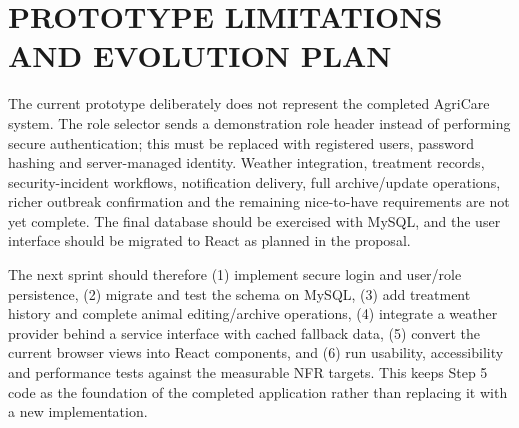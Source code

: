 \documentclass[10pt,twocolumn]{article}
\begin{document}
\section{PROTOTYPE LIMITATIONS AND EVOLUTION PLAN}
The current prototype deliberately does not represent the completed AgriCare system. The role selector sends a demonstration role header instead of performing secure authentication; this must be replaced with registered users, password hashing and server-managed identity. Weather integration, treatment records, security-incident workflows, notification delivery, full archive/update operations, richer outbreak confirmation and the remaining nice-to-have requirements are not yet complete. The final database should be exercised with MySQL, and the user interface should be migrated to React as planned in the proposal.

The next sprint should therefore (1) implement secure login and user/role persistence, (2) migrate and test the schema on MySQL, (3) add treatment history and complete animal editing/archive operations, (4) integrate a weather provider behind a service interface with cached fallback data, (5) convert the current browser views into React components, and (6) run usability, accessibility and performance tests against the measurable NFR targets. This keeps Step 5 code as the foundation of the completed application rather than replacing it with a new implementation.
\end{document}
